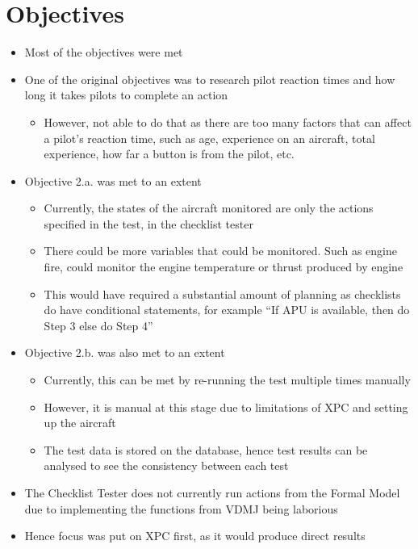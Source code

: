 \documentclass[../dissertation.tex]{subfiles}
\begin{document}
\section{Objectives}
\begin{itemize}
  \item Most of the objectives were met
  \item One of the original objectives was to research pilot
    reaction times and how long it takes pilots to complete an action
  \begin{itemize}
    \item However, not able to do that as there are too many factors
      that can affect a pilot's reaction time, such as age,
      experience on an aircraft, total experience, how far a button is
      from the pilot, etc.
  \end{itemize}
  \item Objective 2.a. was met to an extent
  \begin{itemize}
    \item Currently, the states of the aircraft monitored are only
      the actions specified in the test, in the checklist tester
    \item There could be more variables that could be monitored. Such
      as engine fire, could monitor the engine temperature or thrust
      produced by engine
    \item This would have required a substantial amount of planning
      as checklists do have conditional statements,
      for example \enquote{If APU is available, then do Step 3 else do Step 4}
  \end{itemize}
  \item Objective 2.b. was also met to an extent
  \begin{itemize}
    \item Currently, this can be met by re-running the test multiple
      times manually
    \item However, it is manual at this stage due to limitations of XPC
      and setting up the aircraft
    \item The test data is stored on the database, hence test results
      can be analysed to see the consistency between each test
  \end{itemize}
  \item The Checklist Tester does not currently run actions from the
    Formal Model due to implementing the functions from VDMJ being
    laborious
  \item Hence focus was put on XPC first, as it would produce direct results
\end{itemize}
\end{document}
